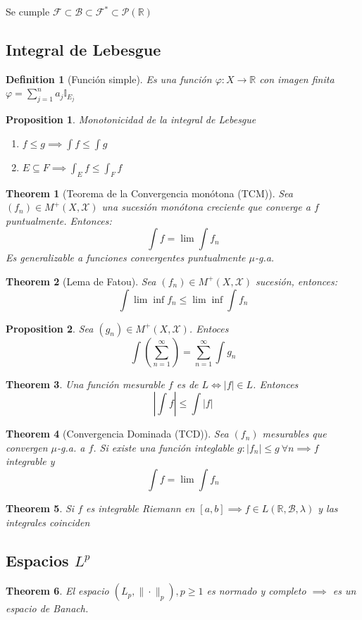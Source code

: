 \documentclass{myclass}
\newtheorem*{definition}{Definition}
\newtheorem*{theorem}{Theorem}
\newtheorem*{proposition}{Proposition}
\begin{document}
Se cumple $\mathcal{F}\subset \mathcal{B} \subset \mathcal{F}^* \subset \mathcal{P}(\mathbb{R})$

\subsection{Integral de Lebesgue}
\begin{definition}[Función simple]
Es una función $\varphi : X \to \mathbb{R}$ con imagen finita $\varphi = \sum_{j=1}^n a_j \mathbb{I}_{E_j}$
\end{definition}

\begin{proposition}
Monotonicidad de la integral de Lebesgue 
\begin{enumerate}[topsep=-6pt, itemsep=0pt]
  \item $f\le g \implies \int f \le \int g$
  \item $E\subseteq F \implies \int_E f\le \int_F f$
\end{enumerate}
\end{proposition}

\begin{theorem}[Teorema de la Convergencia monótona (TCM)]
Sea $(f_n) \in M^+(X, \mathcal{X})$ una sucesión monótona creciente que converge a $f$ puntualmente. Entonces:
\[
\int f= \lim \int f_n
\] 
Es generalizable a funciones convergentes puntualmente $\mu$-g.a.
\end{theorem}

\begin{theorem}[Lema de Fatou]
Sea $(f_n) \in M^+(X, \mathcal{X})$ sucesión, entonces:
\[
\int \lim \inf f_n \le \lim \inf \int f_n
\] 
\end{theorem}

\begin{proposition} Sea $(g_n) \in M^+(X, \mathcal{X})$. Entoces
  \[
 \int \left( \sum_{n=1}^\infty \right)  =\sum_{n=1}^\infty \int g_n
  \] 
\end{proposition}

\begin{theorem} Una función mesurable $f$ es de $L \iff  |f|\in L$. Entonces
  \[
|\int f|\le \int |f|  
  \] 
\end{theorem}

\begin{theorem}[Convergencia Dominada (TCD)]
Sea $(f_n)$ mesurables que convergen $\mu$-g.a. a $f$. Si existe una función integlable $g: |f_n|\le g \ \forall n \implies f$ integrable y
\[
\int f = \lim \int f_n
\] 
\end{theorem}

\begin{theorem} Si $f$ es integrable Riemann en $[a, b] \implies f\in L(\mathbb{R}, \mathcal{B}, \lambda )$ y las integrales coinciden
\end{theorem}

\subsection{Espacios $L^p$}
\begin{theorem}
 El espacio $(L_p, \|\cdot \|_{p}), p\ge 1$ es normado y completo $\implies$ es un espacio de Banach.
\end{theorem}
\end{document}
